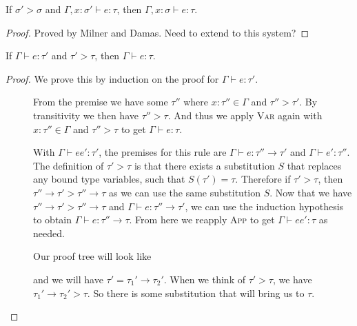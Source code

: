 \begin{lemma}
  If $\sigma' > \sigma$ and $\Gamma,x : \sigma' \vdash e : \tau$, then $\Gamma, x : \sigma \vdash e : \tau$.
  \label{lem:generalInContext}
\end{lemma}
\begin{proof}
  Proved by Milner and Damas. Need to extend to this system?
\end{proof}

\begin{lemma}
  If $\Gamma \vdash e : \tau'$ and $\tau' > \tau$, then $\Gamma \vdash e : \tau$.
\end{lemma}
\begin{proof}
  We prove this by induction on the proof for $\Gamma \vdash e : \tau'$.
  \begin{description}
  \item[\textmd{}]
    From the premise we have some $\tau''$ where $x : \tau'' \in \Gamma$ and $\tau'' >
    \tau'$. By transitivity we then have $\tau'' > \tau$. And thus we apply
    \textsc{Var} again with $x : \tau'' \in \Gamma$ and $\tau'' > \tau$ to get $\Gamma
    \vdash e : \tau$. 
  \item[\textmd{}]
    With $\Gamma \vdash e e' : \tau'$, the premises for this rule are $\Gamma \vdash e : \tau'' \rightarrow \tau'$ and $\Gamma \vdash e' :
    \tau''$.
    The definition of $\tau' > \tau$ is that there exists a
    substitution $S$ that replaces any bound type variables, such that
    $S(\tau') = \tau$.
    Therefore if $\tau' > \tau$, then $\tau'' \rightarrow \tau' > \tau'' \rightarrow \tau$ as we can use the
    same substitution $S$. 
    Now that we have $\tau'' \rightarrow \tau' > \tau'' \rightarrow \tau$ and $\Gamma \vdash e : \tau'' \rightarrow
    \tau'$, we can use the induction hypothesis to obtain $\Gamma \vdash e : \tau'' \rightarrow
    \tau$. From here we reapply \textsc{App} to get $\Gamma \vdash e e' : \tau$ as
    needed.
  \item[\textmd{}]
    Our proof tree will look like
    \begin{mathpar}
    \end{mathpar}
    and we will have $\tau' = \tau_1' \rightarrow \tau_2'$. When we think of $\tau' > \tau$, we
    have $\tau_1' \rightarrow \tau_2' > \tau$. So there is some substitution that will
    bring us to $\tau$.


\end{description}
\end{proof}
